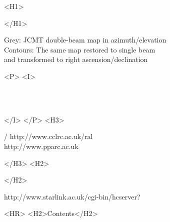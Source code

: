 \begin{htmlonly}
   \xlabel{}
   \begin{rawhtml} <H1> \end{rawhtml}
      \stardoctitle
   \begin{rawhtml} </H1> \end{rawhtml}

   \begin{figure}[h]
   \epsfysize=130mm
   \end{figure}

   Grey: JCMT double-beam map in azimuth/elevation\\
   Contours: The same map restored to single beam\\
   and transformed to right ascension/declination

   \begin{rawhtml} <P> <I> \end{rawhtml}
   \stardoccategory \stardocnumber \\
   \stardocauthors \\
   \stardocdate
   \begin{rawhtml} </I> </P> <H3> \end{rawhtml}
       /
                        {http://www.cclrc.ac.uk/ral} \\
                        {http://www.pparc.ac.uk} \\
   \begin{rawhtml} </H3> <H2> \end{rawhtml}
   \begin{rawhtml} </H2> \end{rawhtml}
      {http://www.starlink.ac.uk/cgi-bin/hcserver?\stardocsource}\\

  \label{stardoccontents}
  \begin{rawhtml} 
    <HR>
    <H2>Contents</H2>
  \end{rawhtml}
  \renewcommand{\latexonlytoc}[0]{}


\end{htmlonly}
